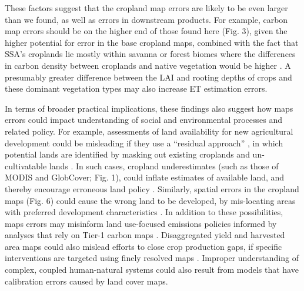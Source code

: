 \documentclass[12 pt, titlepage, a4paper]{article}
\begin{document}
These factors suggest that the cropland map errors are likely to be even larger than we found, as well as errors in downstream products. For example, carbon map errors should be on the higher end of those found here (Fig. 3), given the higher potential for error in the base cropland maps, combined with the fact that SSA's croplands lie mostly within savanna or forest biomes where the differences in carbon density between croplands and native vegetation would be higher \citep{searchinger_high_2015}. A presumably greater difference between the LAI and rooting depths of crops and these dominant vegetation types may also increase ET estimation errors.  

In terms of broader practical implications, these findings also suggest how maps errors could impact understanding of social and environmental processes and related policy. For example, assessments of land availability for new agricultural development could be misleading if they use a ``residual approach'' \citep{lambin_estimating_2013}, in which potential lands are identified by masking out existing croplands and un-cultivatable lands \citep[e.g.][]{estes_reconciling_2016}. In such cases, cropland underestimates (such as those of MODIS and GlobCover; Fig. 1), could inflate estimates of available land, and thereby encourage erroneous land policy \citep{rulli_global_2013}. Similarly, spatial errors in the cropland maps (Fig. 6) could cause the wrong land to be developed, by mis-locating areas with preferred development characteristics \citep[e.g. high agricultural potential and low environmental cost;][]{estes_reconciling_2016, gasparri_emerging_2015}. In addition to these possibilities, maps errors may misinform land use-focused emissions policies informed by analyses that rely on Tier-1 carbon maps \citep[e.g.][]{phelps_agricultural_2013,cattaneo_international_2010}. Disaggregated yield and harvested area maps could also mislead efforts to close crop production gaps, if specific interventions are targeted using finely resolved maps \citep[e.g. the 10 km map shown in Figure 3 in ][]{foley_solutions_2011}. Improper understanding of complex, coupled human-natural systems could also result from models that have calibration errors caused by land cover maps. 

\vspace{-0.3 cm}
\end{document}

